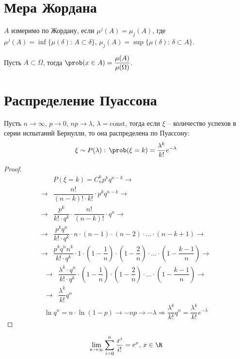 \documentclass[12pt]{article}
\begin{document}
\section{Мера Жордана}
\begin{definition}
    $A$ измеримо по Жордану, если $\mu^j(A)=\mu_j(A)$, где $\mu^j(A)=\inf\{\mu(\delta):\,A\subset \delta\}$, $\mu_j(A)=\sup\{\mu(\delta):\,\delta \subset A\}$.
\end{definition}
\begin{definition}
    Пусть $A\subset \Omega$, тогда $\prob(x\in A)=\dfrac{\mu(A)}{\mu(\Omega)}$.
\end{definition}

\section{Распределение Пуассона}
\begin{theorem}
    Пусть $n\to\infty$, $p\to 0$, $np\to \lambda$, $\lambda=\text{const}$, тогда если $\xi$ -- количество успехов в серии испытаний Бернулли, то она распределена по Пуассону:
    $$\xi \sim P(\lambda):\,\prob(\xi=k)=\dfrac{\lambda^k}{k!}e^{-\lambda}$$
\end{theorem}
\begin{proof}
    \begin{align*}
        &P(\xi=k)=C_n^kp^kq^{n-k}\to\\
        \to&\dfrac{n!}{(n-k)!\cdot k!}\cdot p^kq^{n-k}\to\\
        \to&\dfrac{p^k}{k!\cdot q^k}\cdot \dfrac{n!}{(n-k)!}\cdot q^n\to\\
        \to&\dfrac{p^kq^n}{k!\cdot q^k}\cdot n\cdot(n-1)\cdot(n-2)\cdot\ldots\cdot(n-k+1)\to\\
        \to&\dfrac{p^kq^nn^k}{k!\cdot q^k}\cdot 1\cdot\left(1-\dfrac{1}{n}\right)\cdot\left(1-\dfrac{2}{n}\right)\cdot\ldots\cdot\left(1-\dfrac{k-1}{n}\right)\to
    \end{align*}
    \begin{align*}
        \to&\dfrac{\lambda^k\cdot q^n}{k!\cdot q^k}\cdot\left(1-\dfrac{1}{n}\right)\cdot\left(1-\dfrac{2}{n}\right)\cdot\ldots\cdot\left(1-\dfrac{k-1}{n}\right)\to\\
        \to&\dfrac{\lambda^k}{k!}q^n
    \end{align*}
    $$\ln q^n= n\cdot \ln(1-p)\to -np\to-\lambda \Longrightarrow \dfrac{\lambda^k}{k!}q^n = \dfrac{\lambda^k}{k!}e^{-\lambda}$$
\end{proof}
\begin{theorem}
    $$\lim_{n\to\infty}\sum_{i=0}^n\dfrac{x^i}{i!}=e^x,\,x\in \R$$
\end{theorem}
\end{document}
